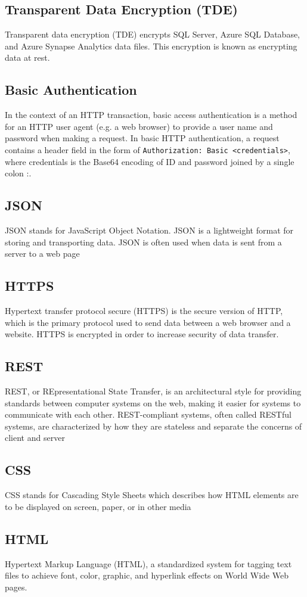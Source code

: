 \subsection*{Transparent Data Encryption (TDE)}
Transparent data encryption (TDE) encrypts SQL Server, Azure SQL Database, and Azure Synapse Analytics data files. This encryption is known as encrypting data at rest.
\subsection*{Basic Authentication}
In the context of an HTTP transaction, basic access authentication is a method for an HTTP user agent (e.g. a web browser) to provide a user name and password when making a request. In basic HTTP authentication, a request contains a header field in the form of \lstinline{Authorization: Basic <credentials>}, where credentials is the Base64 encoding of ID and password joined by a single colon :.

\subsection*{JSON}
JSON stands for JavaScript Object Notation. JSON is a lightweight format for storing and transporting data. JSON is often used when data is sent from a server to a web page
\subsection*{HTTPS}
Hypertext transfer protocol secure (HTTPS) is the secure version of HTTP, which is the primary protocol used to send data between a web browser and a website. HTTPS is encrypted in order to increase security of data transfer. 
\subsection*{REST}
REST, or REpresentational State Transfer, is an architectural style for providing standards between computer systems on the web, making it easier for systems to communicate with each other. REST-compliant systems, often called RESTful systems, are characterized by how they are stateless and separate the concerns of client and server
 \subsection*{CSS}
CSS stands for Cascading Style Sheets which describes how HTML elements are to be displayed on screen, paper, or in other media
\subsection*{HTML}
Hypertext Markup Language (HTML), a standardized system for tagging text files to achieve font, color, graphic, and hyperlink effects on World Wide Web pages.
